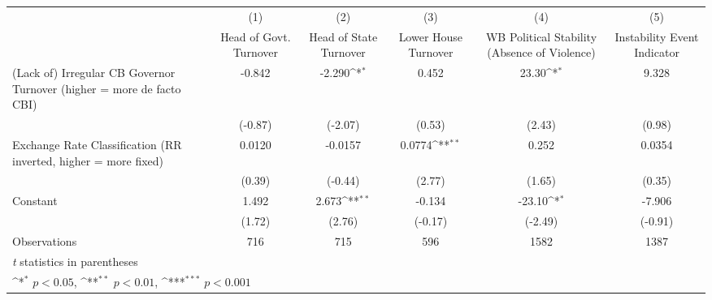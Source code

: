 {
\def\sym#1{\ifmmode^{#1}\else\(^{#1}\)\fi}
\begin{tabular}{l*{5}{c}}
\hline\hline
                &\multicolumn{1}{c}{(1)}&\multicolumn{1}{c}{(2)}&\multicolumn{1}{c}{(3)}&\multicolumn{1}{c}{(4)}&\multicolumn{1}{c}{(5)}\\
                &\multicolumn{1}{c}{Head of Govt. Turnover}&\multicolumn{1}{c}{Head of State Turnover}&\multicolumn{1}{c}{Lower House Turnover}&\multicolumn{1}{c}{WB Political Stability (Absence of Violence)}&\multicolumn{1}{c}{Instability Event Indicator}\\
\hline
(Lack of) Irregular CB Governor Turnover (higher = more de facto CBI)&   -0.842         &   -2.290\sym{*}  &    0.452         &    23.30\sym{*}  &    9.328         \\
                &  (-0.87)         &  (-2.07)         &   (0.53)         &   (2.43)         &   (0.98)         \\
[1em]
Exchange Rate Classification (RR inverted, higher = more fixed)&   0.0120         &  -0.0157         &   0.0774\sym{**} &    0.252         &   0.0354         \\
                &   (0.39)         &  (-0.44)         &   (2.77)         &   (1.65)         &   (0.35)         \\
[1em]
Constant        &    1.492         &    2.673\sym{**} &   -0.134         &   -23.10\sym{*}  &   -7.906         \\
                &   (1.72)         &   (2.76)         &  (-0.17)         &  (-2.49)         &  (-0.91)         \\
\hline
Observations    &      716         &      715         &      596         &     1582         &     1387         \\
\hline\hline
\multicolumn{6}{l}{\footnotesize \textit{t} statistics in parentheses}\\
\multicolumn{6}{l}{\footnotesize \sym{*} \(p<0.05\), \sym{**} \(p<0.01\), \sym{***} \(p<0.001\)}\\
\end{tabular}
}
